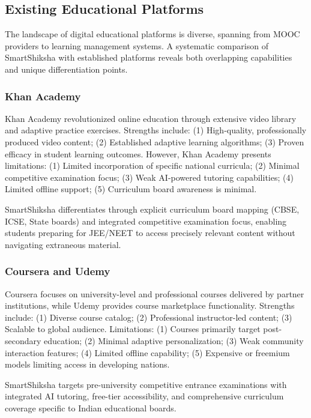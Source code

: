 \documentclass[10pt,conference,compsocconf]{IEEEtran}
\begin{document}
\subsection{Existing Educational Platforms}

The landscape of digital educational platforms is diverse, spanning from MOOC providers to learning management systems. A systematic comparison of SmartShiksha with established platforms reveals both overlapping capabilities and unique differentiation points.

\subsubsection{Khan Academy}

Khan Academy revolutionized online education through extensive video library and adaptive practice exercises. Strengths include: (1) High-quality, professionally produced video content; (2) Established adaptive learning algorithms; (3) Proven efficacy in student learning outcomes. However, Khan Academy presents limitations: (1) Limited incorporation of specific national curricula; (2) Minimal competitive examination focus; (3) Weak AI-powered tutoring capabilities; (4) Limited offline support; (5) Curriculum board awareness is minimal.

SmartShiksha differentiates through explicit curriculum board mapping (CBSE, ICSE, State boards) and integrated competitive examination focus, enabling students preparing for JEE/NEET to access precisely relevant content without navigating extraneous material.

\subsubsection{Coursera and Udemy}

Coursera focuses on university-level and professional courses delivered by partner institutions, while Udemy provides course marketplace functionality. Strengths include: (1) Diverse course catalog; (2) Professional instructor-led content; (3) Scalable to global audience. Limitations: (1) Courses primarily target post-secondary education; (2) Minimal adaptive personalization; (3) Weak community interaction features; (4) Limited offline capability; (5) Expensive or freemium models limiting access in developing nations.

SmartShiksha targets pre-university competitive entrance examinations with integrated AI tutoring, free-tier accessibility, and comprehensive curriculum coverage specific to Indian educational boards.
\end{document}
